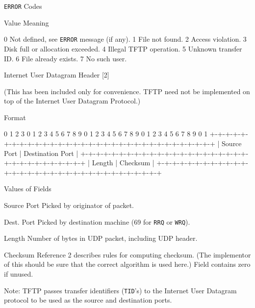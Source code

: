 \documentclass[12pt]{article}
\begin{document}
   \verb|ERROR| Codes
  
   Value   Meaning
  
   0     Not defined, see  \verb|ERROR| message (if any).
   1     File not found.
   2     Access violation.
   3     Disk full or allocation exceeded.
   4     Illegal TFTP operation.
   5     Unknown transfer ID.
   6     File already exists.
   7     No such user.
  
  Internet User Datagram Header [2]
  
   (This has been included only for convenience. TFTP need not be
   implemented on top of the Internet User Datagram Protocol.)
  
    Format
  
    0          1          2          3
    0 1 2 3 4 5 6 7 8 9 0 1 2 3 4 5 6 7 8 9 0 1 2 3 4 5 6 7 8 9 0 1
   +-+-+-+-+-+-+-+-+-+-+-+-+-+-+-+-+-+-+-+-+-+-+-+-+-+-+-+-+-+-+-+-+
   |     Source Port     |    Destination Port    |
   +-+-+-+-+-+-+-+-+-+-+-+-+-+-+-+-+-+-+-+-+-+-+-+-+-+-+-+-+-+-+-+-+
   |      Length       |      Checksum      |
   +-+-+-+-+-+-+-+-+-+-+-+-+-+-+-+-+-+-+-+-+-+-+-+-+-+-+-+-+-+-+-+-+
  
  
   Values of Fields
  
  
   Source Port   Picked by originator of packet.
  
   Dest. Port   Picked by destination machine (69 for \verb|RRQ| or \verb|WRQ|).
  
   Length     Number of bytes in UDP packet, including UDP header.
  
   Checksum    Reference 2 describes rules for computing checksum.
           (The implementor of this should be sure that the
           correct algorithm is used here.)
           Field contains zero if unused.
  
   Note: TFTP passes transfer identifiers (\verb|TID|'s) to the Internet User
   Datagram protocol to be used as the source and destination ports.
\end{document}
